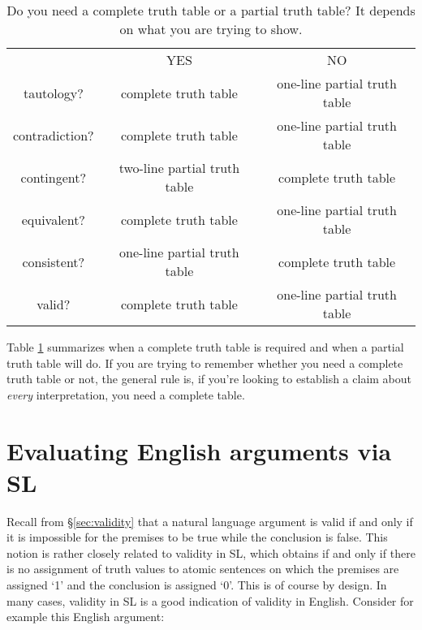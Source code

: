 \begin{table}
\begin{center}
\begin{tabular}{c|c|c|}
\cline{2-3}
 & YES & NO\\
\cline{2-3}
tautology? & complete truth table & one-line partial truth table\\
contradiction? &  complete truth table  & one-line partial truth table\\
contingent? & two-line partial truth table & complete truth table\\
equivalent? & complete truth table & one-line partial truth table\\
consistent? & one-line partial truth table & complete truth table\\
valid? & complete truth table & one-line partial truth table\\
\cline{2-3}
\end{tabular}
\end{center}
\caption{Do you need a complete truth table or a partial truth table? It depends on what you are trying to show.}
\label{table.CompleteVsPartial}
\end{table}

Table \ref{table.CompleteVsPartial} summarizes when a complete truth table is required and when a partial truth table will do. If you are trying to remember whether you need a complete truth table or not, the general rule is, if you're looking to establish a claim about \emph{every} interpretation, you need a complete table.







\section{Evaluating English arguments via SL}
\label{sec:forms}
Recall from \S\ref{sec:validity} that a natural language argument is valid if and only if it is impossible for the premises to be true while the conclusion is false. This notion is rather closely related to validity in SL, which obtains if and only if there is no assignment of truth values to atomic sentences on which the premises are assigned `1' and the conclusion is assigned `0'. This is of course by design. In many cases, validity in SL is a good indication of validity in English. Consider for example this English argument:

